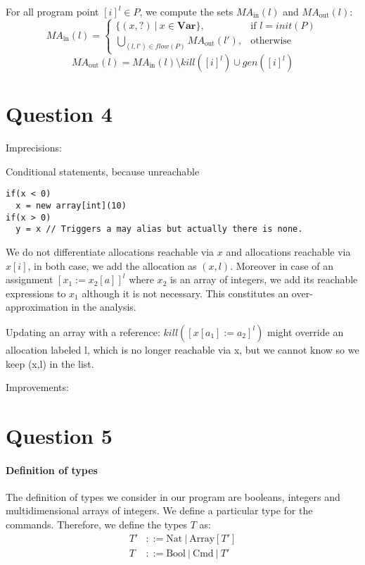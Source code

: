 \documentclass{article}
\begin{document}
For all program point \([i]^l \in P\), we compute the sets \(M\!A_\text{in}(l)\) and \(M\!A_\text{out}(l)\):
 \[
    M\!A_\text{in}(l) =
    \begin{cases}
      \{(x,?)\ |\ x \in \textbf{Var}\},                        & \text{if } l=init(P)\\
      \bigcup\limits_{(l,l') \in flow(P)} M\!A_\text{out}(l'), & \text{otherwise}
    \end{cases}
\]
\[
    M\!A_\text{out}(l) = M\!A_\text{in}(l) \setminus kill([i]^l) \cup gen([i]^l)
\]

\section*{Question 4}
Imprecisions:

Conditional statements, because unreachable 
\begin{lstlisting}
if(x < 0)
  x = new array[int](10)
if(x > 0)
  y = x // Triggers a may alias but actually there is none.
\end{lstlisting}

We do not differentiate allocations reachable via \(x\) and allocations reachable via \(x[i]\), in both case, we add the allocation as \((x,l)\).
Moreover in case of an assignment \([x_1 := x_2[a]]^l\) where \(x_2\) is an array of integers, we add its reachable expressions to \(x_1\) although it is not necessary.
This constitutes an over-approximation in the analysis.

Updating an array with a reference: \( kill([x[a_1] := a_2]^l) \)  might override an allocation labeled l, which is no longer reachable via x, but we cannot know so we keep (x,l) in the list.

Improvements:


\section*{Question 5}
\paragraph{Definition of types}
The definition of types we consider in our program are booleans, integers and multidimensional arrays of integers. We define a particular type for the commands. Therefore, we define the types \(T\) as:
\begin{equation*} \label{eq1}
\begin{split}
T' & ::= \text{Nat}\ |\ \text{Array}[T']\\
T  & ::= \text{Bool}\ |\ \text{Cmd}\ |\ T'
\end{split}
\end{equation*}
\end{document}
